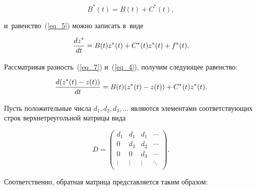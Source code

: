 \begin{multicols}{2}
\vspace*{2pt}

\noindent
\begin{equation*}
B^*(t)=B(t)+C^*(t),
\end{equation*}

\vspace*{-2pt}

\noindent 
и~равенство~(\ref{eq_5}) можно записать в~виде

\vspace*{2pt}

\noindent
\begin{equation}
\label{eq_7}
\displaystyle\frac{\displaystyle dz^*\mathstrut}{\displaystyle dt\mathstrut}=B(t)z^*(t)+ C^*(t)z^*(t)+f^*(t).
\end{equation}

\vspace*{-2pt}

\noindent 
Рассматривая разность~(\ref{eq_7}) и~(\ref{eq_4}), получим сле\-ду\-ющее 
равенство:

\vspace*{2pt}

\noindent
\begin{equation}
\label{eq_8}
\displaystyle\frac{\displaystyle d(z^*(t)-z(t))\mathstrut}{\displaystyle dt\mathstrut}=B(t)(z^*(t)-z(t))+ C^*(t)z^*(t).
\end{equation}

\vspace*{-2pt}

Пусть положительные числа $d_{1}, d_{2}, d_{3}, \ldots$ являются элементами 
соответствующих строк верхнетреугольной матрицы вида

\vspace*{2pt}

\noindent
\begin{equation*}
D= \left(
\begin{array}{cccc}
d_{1}   & d_{1}  & d_{1}   &   \cdots  \\
0       & d_{2}  & d_{2}   &   \cdots  \\
0       & 0      & d_{3}   &   \cdots  \\
\vdots  & \vdots & \vdots  &   \ddots  \\
\end{array}
\right). 
\end{equation*}

\vspace*{-2pt}

\noindent 
Соответственно, обратная матрица представляется таким образом:

\columnbreak


\end{multicols}

